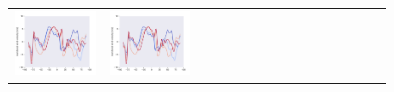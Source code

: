 \documentclass[
11pt, %
english, %
singlespacing, %
headsepline, %
]{MastersDoctoralThesis} %
\begin{document}
\begin{NoHyper}
\begin{refsection}
\begin{subappendices}
\begin{tabular}[c]{l|p{0.25\linewidth}|p{0.25\linewidth}|p{0.25\linewidth}|}
				\includegraphics[width=\linewidth, page=7]{psyplot-figures/psy-simple-demo.pdf} &
				\includegraphics[width=\linewidth, page=8]{psyplot-figures/psy-simple-demo.pdf} &

\end{tabular}
\end{subappendices}
\end{refsection}
\end{NoHyper}
\end{document}
